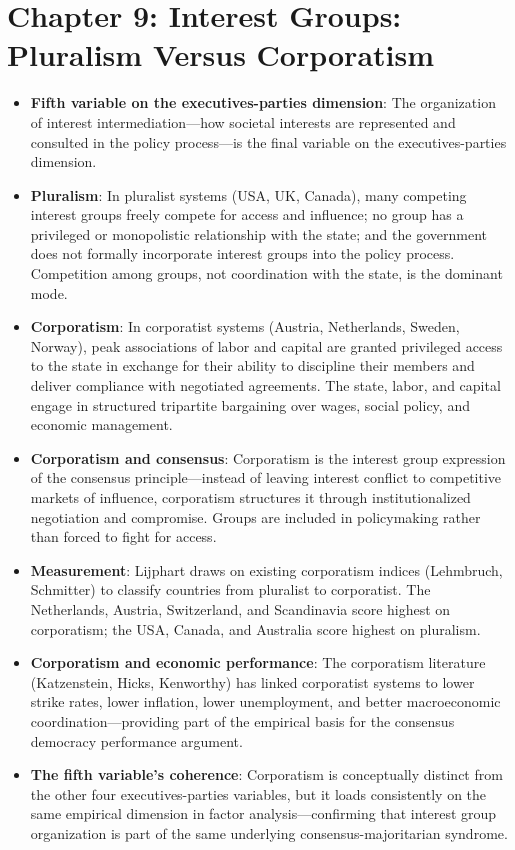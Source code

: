 \documentclass[12pt]{article}
\begin{document}
\section{Chapter 9: Interest Groups: Pluralism Versus Corporatism}

\begin{itemize}[leftmargin=*, itemsep=4pt]
    \item \textbf{Fifth variable on the executives-parties dimension}: The organization of interest intermediation---how societal interests are represented and consulted in the policy process---is the final variable on the executives-parties dimension.
    \item \textbf{Pluralism}: In pluralist systems (USA, UK, Canada), many competing interest groups freely compete for access and influence; no group has a privileged or monopolistic relationship with the state; and the government does not formally incorporate interest groups into the policy process. Competition among groups, not coordination with the state, is the dominant mode.
    \item \textbf{Corporatism}: In corporatist systems (Austria, Netherlands, Sweden, Norway), peak associations of labor and capital are granted privileged access to the state in exchange for their ability to discipline their members and deliver compliance with negotiated agreements. The state, labor, and capital engage in structured tripartite bargaining over wages, social policy, and economic management.
    \item \textbf{Corporatism and consensus}: Corporatism is the interest group expression of the consensus principle---instead of leaving interest conflict to competitive markets of influence, corporatism structures it through institutionalized negotiation and compromise. Groups are included in policymaking rather than forced to fight for access.
    \item \textbf{Measurement}: Lijphart draws on existing corporatism indices (Lehmbruch, Schmitter) to classify countries from pluralist to corporatist. The Netherlands, Austria, Switzerland, and Scandinavia score highest on corporatism; the USA, Canada, and Australia score highest on pluralism.
    \item \textbf{Corporatism and economic performance}: The corporatism literature (Katzenstein, Hicks, Kenworthy) has linked corporatist systems to lower strike rates, lower inflation, lower unemployment, and better macroeconomic coordination---providing part of the empirical basis for the consensus democracy performance argument.
    \item \textbf{The fifth variable's coherence}: Corporatism is conceptually distinct from the other four executives-parties variables, but it loads consistently on the same empirical dimension in factor analysis---confirming that interest group organization is part of the same underlying consensus-majoritarian syndrome.
\end{itemize}
\end{document}
